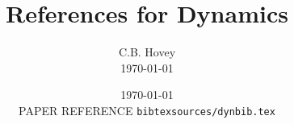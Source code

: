 \documentclass[10pt,reqno]{amsart}
\title{References for Dynamics}
\author{C.B. Hovey \\ \sc\today}
\date{\today \\ PAPER REFERENCE {\tt bibtexsources/dynbib.tex}}
\begin{document}
\maketitle


\nocite{
Alwar75,
Ambrosio96,
Anantharaman91,
Avello91, 
Bauchau95,
Benson85,
Bunce72, 
Cassell76,
Cardona92,
Cardona91,
Cardona91b, 
Cardona89,
Cardona88,
Crisfield94, 
Day65, 
Friberg91,
Galvanetto96,
Geradin81,
Houbolt50, 
Hughes79,
Hughes78, 
Key81, 
Lewis89,
Meijaard91,
Papadrakakis81, 
Park91,
Park82, 
Park80, 
Park75a, 
Park75b, 
Pica80, 
Prevost82, 
Qiang88, 
Ramesh95, 
Ramesh93, 
Rushton68, 
Sauve95,
Shabana91,
Simo95,
Simo94,
Simo92, 
Simo91,
Simo88,
Stricklin77, 
Stewart92,
Underwood83, 
Underwood80, 
Wallrapp91,
Wood71,
Zienkiewicz80,
Zienkiewicz77}







%
\end{document}
